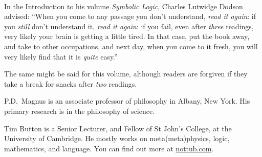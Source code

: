 \thispagestyle{empty}
\onecolumn
\ 
\vfill

\parbox{3 in}{
In the Introduction to his volume \emph{Symbolic Logic}, Charles Lutwidge Dodson advised: ``When you come to any passage you don't understand, \emph{read it again}: if you \emph{still} don't understand it, \emph{read it again}: if you fail, even after \emph{three} readings, very likely your brain is getting a little tired. In that case, put the book away, and take to other occupations, and next day, when you come to it fresh, you will very likely find that it is \emph{quite} easy.''

\medskip

The same might be said for this volume, although readers are forgiven if they take a break for snacks after \emph{two} readings.}

\vfill

\parbox{3 in}{
P.D.\ Magnus is an associate professor of philosophy in Albany, New York. His primary research is in the philosophy of science.

\medskip

Tim Button is a Senior Lecturer, and Fellow of St John's College, at the University of Cambridge. He mostly works on meta(meta)physics, logic, mathematics, and language. You can find out more at \url{nottub.com}.}
\vfill